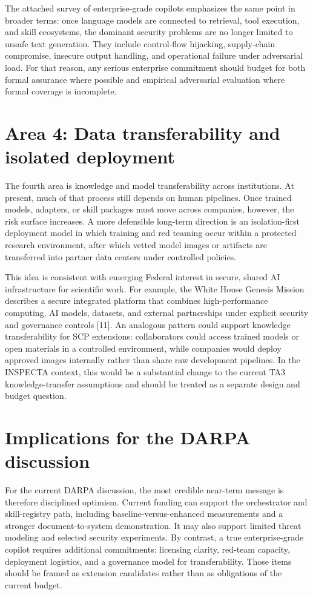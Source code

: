 \documentclass[11pt]{article}
\begin{document}
The attached survey of enterprise-grade copilots emphasizes the same point in broader terms: once language models are connected to retrieval, tool execution, and skill ecosystems, the dominant security problems are no longer limited to unsafe text generation. They include control-flow hijacking, supply-chain compromise, insecure output handling, and operational failure under adversarial load. For that reason, any serious enterprise commitment should budget for both formal assurance where possible and empirical adversarial evaluation where formal coverage is incomplete.

\section{Area 4: Data transferability and isolated deployment}

The fourth area is knowledge and model transferability across institutions. At present, much of that process still depends on human pipelines. Once trained models, adapters, or skill packages must move across companies, however, the risk surface increases. A more defensible long-term direction is an isolation-first deployment model in which training and red teaming occur within a protected research environment, after which vetted model images or artifacts are transferred into partner data centers under controlled policies.

This idea is consistent with emerging Federal interest in secure, shared AI infrastructure for scientific work. For example, the White House Genesis Mission describes a secure integrated platform that combines high-performance computing, AI models, datasets, and external partnerships under explicit security and governance controls [11]. An analogous pattern could support knowledge transferability for SCP extensions: collaborators could access trained models or open materials in a controlled environment, while companies would deploy approved images internally rather than share raw development pipelines. In the INSPECTA context, this would be a substantial change to the current TA3 knowledge-transfer assumptions and should be treated as a separate design and budget question.

\section{Implications for the DARPA discussion}

For the current DARPA discussion, the most credible near-term message is therefore disciplined optimism. Current funding can support the orchestrator and skill-registry path, including baseline-versus-enhanced measurements and a stronger document-to-system demonstration. It may also support limited threat modeling and selected security experiments. By contrast, a true enterprise-grade copilot requires additional commitments: licensing clarity, red-team capacity, deployment logistics, and a governance model for transferability. Those items should be framed as extension candidates rather than as obligations of the current budget.
\end{document}
